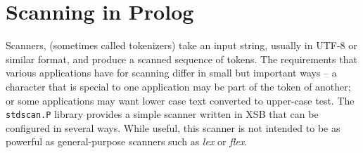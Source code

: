 \section{Scanning in Prolog}

Scanners, (sometimes called tokenizers) take an input string, usually
in UTF-8 or similar format, and produce a scanned sequence of tokens.
The requirements that various applications have for scanning differ in
small but important ways -- a character that is special to one
application may be part of the token of another; or some applications
may want lower case text converted to upper-case test.  The {\tt
stdscan.P} library provides a simple scanner written in XSB that can
be configured in several ways.  While useful, this scanner is not
intended to be as powerful as general-purpose scanners such as {\em
lex} or {\em flex}.

